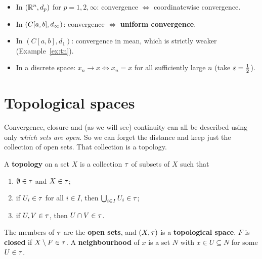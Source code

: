 \begin{example}
\leavevmode
\begin{itemize}
  \item In $(\mathbb{R}^n,d_p)$ for $p=1,2,\infty$: convergence $\iff$ coordinatewise convergence.
  \item In $(C[a,b],d_\infty)$: convergence $\iff$ \textbf{uniform convergence}.
  \item In $(C[a,b],d_1)$: convergence in mean, which is strictly weaker (Example~\ref{ex:tn}).
  \item In a discrete space: $x_n\to x\iff x_n=x$ for all sufficiently large $n$ (take $\varepsilon=\tfrac12$).
\end{itemize}
\end{example}

\section{Topological spaces}
\begin{intuition}
Convergence, closure and (as we will see) continuity can all be described using only \emph{which sets are open}. So we can forget the distance and keep just the collection of open sets. That collection is a topology.
\end{intuition}

\begin{definition}[Topology]\label{def:topology}
A \textbf{topology} on a set $X$ is a collection $\tau$ of subsets of $X$ such that
\begin{enumerate}[label=\textbf{(T\arabic*)},leftmargin=3em]
  \item $\emptyset\in\tau$ and $X\in\tau$;
  \item if $U_i\in\tau$ for all $i\in I$, then $\bigcup_{i\in I}U_i\in\tau$;
  \item if $U,V\in\tau$, then $U\cap V\in\tau$.
\end{enumerate}
The members of $\tau$ are the \textbf{open sets}, and $(X,\tau)$ is a \textbf{topological space}. $F$ is \textbf{closed} if $X\setminus F\in\tau$. A \textbf{neighbourhood} of $x$ is a set $N$ with $x\in U\subseteq N$ for some $U\in\tau$.
\end{definition}


